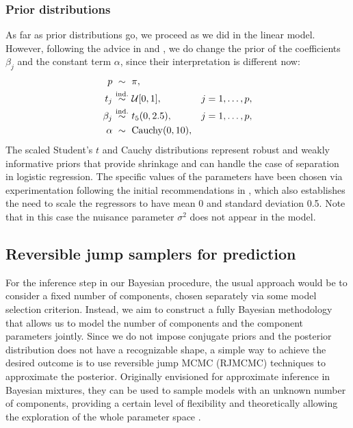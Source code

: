 \documentclass{article}
\numberwithin{equation}{section}
\theoremstyle{plain}
\theoremstyle{definition}
\newcommand{\textoversim}[1]{\overset{\text{#1}}{\sim}}
\begin{document}
\subsubsection*{Prior distributions}

As far as prior distributions go, we proceed as we did in the linear model. However, following the advice in \citet{gelman2008weakly} and \citet{ghosh2018use}, we do change the prior of the coefficients \(\beta_j\) and the constant term \(\alpha\), since their interpretation is different now:
\begin{equation}\label{eq:prior-logistic}
  \begin{array}{r@{\ }c@{\ }l@{\quad}l}
    p       & \sim               & \pi,                   &                \\[0.3em]
    t_j     & \textoversim{ind.} & \mathcal{U}[0,1],      & j = 1,\dots,p, \\[0.3em]
    \beta_j & \textoversim{ind.} & t_5(0,2.5),            & j = 1,\dots,p, \\[0.3em]
    \alpha  & \sim               & \mathrm{Cauchy}(0,10), &
  \end{array}
  \end{equation}
The scaled Student's \(t\) and Cauchy distributions represent robust and weakly informative priors that provide shrinkage and can handle the case of separation in logistic regression. The specific values of the parameters have been chosen via experimentation following the initial recommendations in \citet{ghosh2018use}, which also establishes the need to scale the regressors to have mean 0 and standard deviation 0.5. Note that in this case the nuisance parameter \(\sigma^2\) does not appear in the model.

\subsection{Reversible jump samplers for prediction}\label{sec:rjmcmc}

For the inference step in our Bayesian procedure, the usual approach would be to consider a fixed number of components, chosen separately via some model selection criterion. Instead, we aim to construct a fully Bayesian methodology that allows us to model the number of components and the component parameters jointly. Since we do not impose conjugate priors and the posterior distribution does not have a recognizable shape, a simple way to achieve the desired outcome is to use reversible jump MCMC (RJMCMC) techniques to approximate the posterior. Originally envisioned for approximate inference in Bayesian mixtures, they can be used to sample models with an unknown number of components, providing a certain level of flexibility and theoretically allowing the exploration of the whole parameter space \citep[see][]{richardson1997bayesian}.
\end{document}
